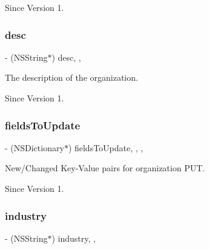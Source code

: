 \begin{DoxySince}{Since}
Version 1. 
\end{DoxySince}
\hypertarget{class_x_i_organization_info_a7399ceb64f7a53eb710b6ed044111d03}{}\label{class_x_i_organization_info_a7399ceb64f7a53eb710b6ed044111d03} 
\subsubsection{\texorpdfstring{desc}{desc}}
{\footnotesize\ttfamily -\/ (N\+S\+String$\ast$) desc\hspace{0.3cm}{\ttfamily [read]}, {\ttfamily [nonatomic]}, {\ttfamily [assign]}}



The description of the organization. 

\begin{DoxySince}{Since}
Version 1. 
\end{DoxySince}
\hypertarget{class_x_i_organization_info_a75ed2243f8baedafe76240d208eea53d}{}\label{class_x_i_organization_info_a75ed2243f8baedafe76240d208eea53d} 
\subsubsection{\texorpdfstring{fields\+To\+Update}{fieldsToUpdate}}
{\footnotesize\ttfamily -\/ (N\+S\+Dictionary$\ast$) fields\+To\+Update\hspace{0.3cm}{\ttfamily [read]}, {\ttfamily [write]}, {\ttfamily [nonatomic]}, {\ttfamily [assign]}}



New/\+Changed Key-\/\+Value pairs for organization P\+UT. 

\begin{DoxySince}{Since}
Version 1. 
\end{DoxySince}
\hypertarget{class_x_i_organization_info_a9808d9486744ee25fad8cfefa9ecabf8}{}\label{class_x_i_organization_info_a9808d9486744ee25fad8cfefa9ecabf8} 
\subsubsection{\texorpdfstring{industry}{industry}}
{\footnotesize\ttfamily -\/ (N\+S\+String$\ast$) industry\hspace{0.3cm}{\ttfamily [read]}, {\ttfamily [nonatomic]}, {\ttfamily [assign]}}



